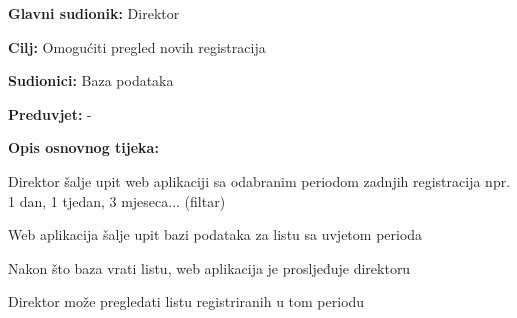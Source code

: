 				\noindent {}
				\begin{packed_item}
					
					\item \textbf{Glavni sudionik:} Direktor
					\item  \textbf{Cilj:} Omogućiti pregled novih registracija
					\item  \textbf{Sudionici:} Baza podataka
					\item  \textbf{Preduvjet:} -
					\item  \textbf{Opis osnovnog tijeka:}
					
					\item[] \begin{packed_enum}
						
						\item Direktor šalje upit web aplikaciji sa odabranim periodom zadnjih registracija npr. 1 dan, 1 tjedan, 3 mjeseca... (filtar)
						\item Web aplikacija šalje upit bazi podataka za listu sa uvjetom perioda
						\item Nakon što baza vrati listu, web aplikacija je prosljeđuje direktoru
						\item Direktor može pregledati listu registriranih u tom periodu
						
					\end{packed_enum}
					
				\end{packed_item}
				
